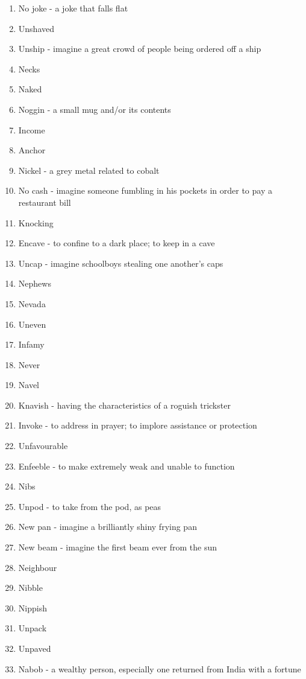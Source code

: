 \begin{enumerate}
        \item No joke - a joke that falls flat
        \item Unshaved
        \item Unship - imagine a great crowd of people being ordered off a ship
        \item Necks
        \item Naked
        \item Noggin - a small mug and/or its contents
        \item Income
        \item Anchor
        \item Nickel - a grey metal related to cobalt
        \item No cash - imagine someone fumbling in his pockets in order to pay a restaurant bill
        \item Knocking
        \item Encave - to confine to a dark place; to keep in a cave
        \item Uncap - imagine schoolboys stealing one another's caps
        \item Nephews
        \item Nevada
        \item Uneven
        \item Infamy
        \item Never
        \item Navel
        \item Knavish - having the characteristics of a roguish trickster
        \item Invoke - to address in prayer; to implore assistance or protection
        \item Unfavourable
        \item Enfeeble - to make extremely weak and unable to function
        \item Nibs
        \item Unpod - to take from the pod, as peas
        \item New pan - imagine a brilliantly shiny frying pan
        \item New beam - imagine the first beam ever from the sun
        \item Neighbour
        \item Nibble
        \item Nippish
        \item Unpack
        \item Unpaved
        \item Nabob - a wealthy person, especially one returned from India with a fortune

\end{enumerate}
